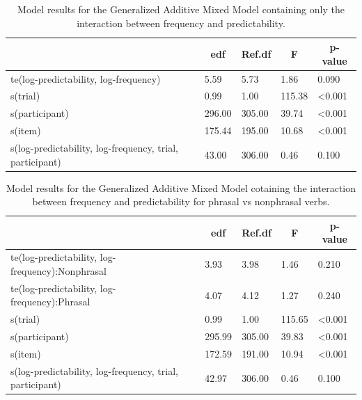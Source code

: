 \documentclass[
  man,floatsintext]{apa6}
\begin{document}
\begin{table}[H]

\begin{center}
\begin{threeparttable}

\caption{\label{tab:gamModelTab}Model results for the Generalized Additive Mixed Model containing only the interaction between frequency and predictability.}

\begin{tabular}{lllll}
\toprule
 & \multicolumn{1}{c}{edf} & \multicolumn{1}{c}{Ref.df} & \multicolumn{1}{c}{F} & \multicolumn{1}{c}{p-value}\\
\midrule
te(log-predictability, log-frequency) & 5.59 & 5.73 & 1.86 & 0.090\\
s(trial) & 0.99 & 1.00 & 115.38 & <0.001\\
s(participant) & 296.00 & 305.00 & 39.74 & <0.001\\
s(item) & 175.44 & 195.00 & 10.68 & <0.001\\
s(log-predictability, log-frequency, trial, participant) & 43.00 & 306.00 & 0.46 & 0.100\\
\bottomrule
\end{tabular}

\end{threeparttable}
\end{center}

\end{table}

\begin{table}[H]

\begin{center}
\begin{threeparttable}

\caption{\label{tab:gamModelPhrasalNonPhrasalTab}Model results for the Generalized Additive Mixed Model cotaining the interaction between frequency and predictability for phrasal vs nonphrasal verbs.}

\begin{tabular}{lllll}
\toprule
 & \multicolumn{1}{c}{edf} & \multicolumn{1}{c}{Ref.df} & \multicolumn{1}{c}{F} & \multicolumn{1}{c}{p-value}\\
\midrule
te(log-predictability, log-frequency):Nonphrasal & 3.93 & 3.98 & 1.46 & 0.210\\
te(log-predictability, log-frequency):Phrasal & 4.07 & 4.12 & 1.27 & 0.240\\
s(trial) & 0.99 & 1.00 & 115.65 & <0.001\\
s(participant) & 295.99 & 305.00 & 39.83 & <0.001\\
s(item) & 172.59 & 191.00 & 10.94 & <0.001\\
s(log-predictability, log-frequency, trial, participant) & 42.97 & 306.00 & 0.46 & 0.100\\
\bottomrule
\end{tabular}

\end{threeparttable}
\end{center}

\end{table}
\end{document}
